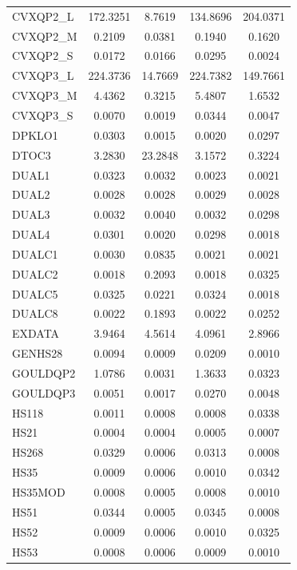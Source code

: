 \begin{longtable}{lcccc}
CVXQP2\_L & 172.3251 &   8.7619 & 134.8696 & 204.0371 \\
CVXQP2\_M &   0.2109 &   0.0381 &   0.1940 &   0.1620 \\
CVXQP2\_S &   0.0172 &   0.0166 &   0.0295 &   0.0024 \\
CVXQP3\_L & 224.3736 &  14.7669 & 224.7382 & 149.7661 \\
CVXQP3\_M &   4.4362 &   0.3215 &   5.4807 &   1.6532 \\
CVXQP3\_S &   0.0070 &   0.0019 &   0.0344 &   0.0047 \\
DPKLO1   &   0.0303 &   0.0015 &   0.0020 &   0.0297 \\
DTOC3    &   3.2830 &  23.2848 &   3.1572 &   0.3224 \\
DUAL1    &   0.0323 &   0.0032 &   0.0023 &   0.0021 \\
DUAL2    &   0.0028 &   0.0028 &   0.0029 &   0.0028 \\
DUAL3    &   0.0032 &   0.0040 &   0.0032 &   0.0298 \\
DUAL4    &   0.0301 &   0.0020 &   0.0298 &   0.0018 \\
DUALC1   &   0.0030 &   0.0835 &   0.0021 &   0.0021 \\
DUALC2   &   0.0018 &   0.2093 &   0.0018 &   0.0325 \\
DUALC5   &   0.0325 &   0.0221 &   0.0324 &   0.0018 \\
DUALC8   &   0.0022 &   0.1893 &   0.0022 &   0.0252 \\
EXDATA   &   3.9464 &   4.5614 &   4.0961 &   2.8966 \\
GENHS28  &   0.0094 &   0.0009 &   0.0209 &   0.0010 \\
GOULDQP2 &   1.0786 &   0.0031 &   1.3633 &   0.0323 \\
GOULDQP3 &   0.0051 &   0.0017 &   0.0270 &   0.0048 \\
HS118    &   0.0011 &   0.0008 &   0.0008 &   0.0338 \\
HS21     &   0.0004 &   0.0004 &   0.0005 &   0.0007 \\
HS268    &   0.0329 &   0.0006 &   0.0313 &   0.0008 \\
HS35     &   0.0009 &   0.0006 &   0.0010 &   0.0342 \\
HS35MOD  &   0.0008 &   0.0005 &   0.0008 &   0.0010 \\
HS51     &   0.0344 &   0.0005 &   0.0345 &   0.0008 \\
HS52     &   0.0009 &   0.0006 &   0.0010 &   0.0325 \\
HS53     &   0.0008 &   0.0006 &   0.0009 &   0.0010 \\

\end{longtable}
